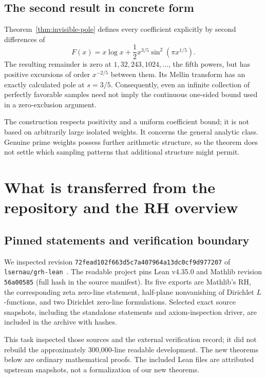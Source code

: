 \documentclass[11pt,a4paper]{article}
\theoremstyle{definition}
\theoremstyle{remark}
\numberwithin{equation}{section}
\begin{document}
\subsection{The second result in concrete form}

Theorem~\ref{thm:invisible-pole} defines every coefficient explicitly by
second differences of
\[
 F(x)=x\log x+\frac12 x^{3/5}\sin^2(\pi x^{1/5}).
\]
The resulting remainder is zero at $1,32,243,1024,\ldots$, the fifth
powers, but has positive excursions of order $x^{-2/5}$ between them.
Its Mellin transform has an exactly calculated pole at $s=3/5$.
Consequently, even an infinite collection of perfectly favorable
samples need not imply the continuous one-sided bound used in a
zero-exclusion argument.

The construction respects positivity and a uniform coefficient bound;
it is not based on arbitrarily large isolated weights. It concerns the
general analytic class. Genuine prime weights possess further arithmetic
structure, so the theorem does not settle which sampling patterns that
additional structure might permit.

\section{What is transferred from the repository and the RH overview}

\subsection{Pinned statements and verification boundary}

We inspected revision
\texttt{72fead102f663d5c7a407964a13dc0cf9d977207} of
\texttt{lsernau/grh-lean}~\cite{Repository}.
The readable project pins Lean v4.35.0 and Mathlib revision
\texttt{56a00585} (full hash in the source manifest).
Its five exports are Mathlib's RH, the corresponding zeta zero-line
statement, half-plane nonvanishing of Dirichlet $L$-functions, and two
Dirichlet zero-line formulations. Selected exact source snapshots, including the standalone statements and axiom-inspection driver, are
included in the archive with hashes.

This task inspected those sources and the external verification record;
it did not rebuild the approximately 300,000-line readable development.
The new theorems below are ordinary mathematical proofs. The included
Lean files are attributed upstream snapshots, not a formalization of
our new theorems.
\end{document}
